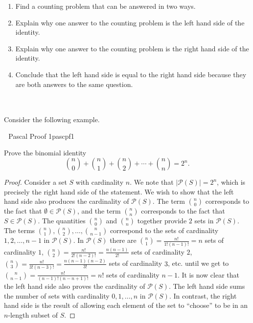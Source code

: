     \begin{enumerate}
        \item Find a counting problem that can be answered in two ways.
        \item Explain why one answer to the counting problem is the left hand side of the identity.
        \item Explain why one answer to the counting problem is the right hand side of the identity.
        \item Conclude that the left hand side is equal to the right hand side because they are both answers to the same question.
    \end{enumerate}
    \vphantom
    \\
    \\
    Consider the following example.
    \begin{example}{\Difficulty\,\Difficulty\,\Difficulty\,\,Pascal Proof 1}{pascpf1}
    
        Prove the binomial identity
        \begin{equation*}
            \binom{n}{0}+\binom{n}{1}+\binom{n}{2}+\cdots+\binom{n}{n}=2^n.
        \end{equation*}
        \begin{proof}
            Consider a set \(S\) with cardinality \(n\). We note that \(|\mathcal{P}(S)|=2^n\), which is precisely the right hand side of the statement. We wish to show that the left hand side also produces the cardinality of \(\mathcal{P}(S)\). The term \(\binom{n}{0}\) corresponds to the fact that \(\emptyset\in\mathcal{P}(S)\), and the term \(\binom{n}{n}\) corresponds to the fact that \(S\in\mathcal{P}(S)\). The quantities \(\binom{n}{0}\) and \(\binom{n}{n}\) together provide \(2\) sets in \(\mathcal{P}(S)\). The terms \(\binom{n}{1},\binom{n}{2},\ldots,\binom{n}{n-1}\) correspond to the sets of cardinality \(1,2,\ldots,n-1\) in \(\mathcal{P}(S)\). In \(\mathcal{P}(S)\) there are \(\binom{n}{1}=\frac{n!}{1!(n-1)!}=n\) sets of cardinality \(1\), \(\binom{n}{2}=\frac{n!}{2!(n-2)!}=\frac{n(n-1)}{2!}\) sets of cardinality \(2\), \(\binom{n}{3}=\frac{n!}{3!(n-3)!}=\frac{n(n-1)(n-2)}{3!}\) sets of cardinality \(3\), etc. until we get to \(\binom{n}{n-1}=\frac{n!}{(n-1)!(n-n+1)!}=n!\) sets of cardinality \(n-1\). It is now clear that the left hand side also proves the cardinality of \(\mathcal{P}(S)\). The left hand side sums the number of sets with cardinality \(0,1,\ldots,n\) in \(\mathcal{P}(S)\). In contrast, the right hand side is the result of allowing each element of the set to ``choose'' to be in an \(n\)-length subset of \(S\).
        \end{proof}
    
    \end{example}